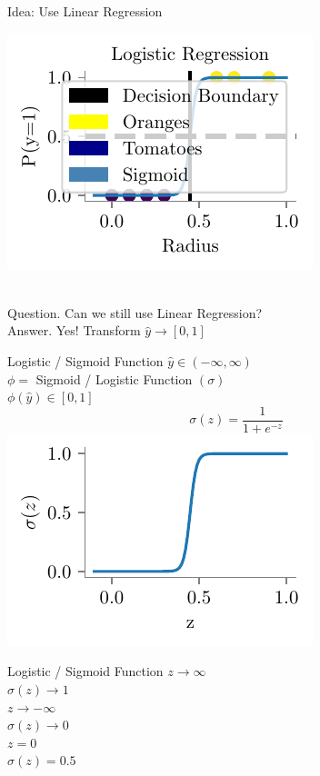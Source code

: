 \documentclass{beamer}
\begin{document}
\begin{frame}{Idea: Use Linear Regression}
\hspace{1cm}
\begin{minipage}{0.3\textwidth}
\includegraphics{../figures/logistic-regression/logistic.pdf}
\end{minipage} \\
Question. Can we still use Linear Regression? \\
Answer. Yes! Transform $\hat{y} \rightarrow [0, 1]$
\end{frame}

\begin{frame}{Logistic / Sigmoid Function}
$\hat{y} \in (-\infty, \infty)$ \\
$\phi =$ Sigmoid / Logistic Function $(\sigma)$ \\
$\phi(\hat{y}) \in [0, 1]$
\begin{equation*}
\sigma(z) = \frac{1}{1 + e^{-z}}
\end{equation*}
\includegraphics{../figures/logistic-regression/logistic-function.pdf}
\end{frame}

\begin{frame}{Logistic / Sigmoid Function}
 $z \rightarrow \infty$\\
\pause  $\sigma(z) \rightarrow 1$\\
\pause $z \rightarrow -\infty$\\
 \pause $\sigma(z) \rightarrow 0$\\
 \pause $z = 0$\\
 \pause $\sigma(z) = 0.5$

\end{frame}
\end{document}
